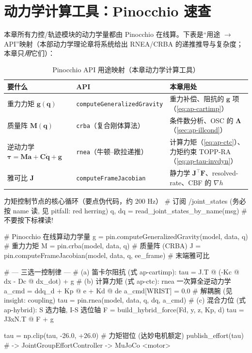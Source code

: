\section{动力学计算工具：Pinocchio 速查}
\label{sec:ap-pinocchio}

本章所有力控/轨迹模块的动力学量都由 Pinocchio 在线算。下表是“用途 $\to$ API”映射（本部动力学理论章将系统给出 RNEA/CRBA 的递推推导与复杂度；本章只\emph{用}它们）：

\begin{table}[H]\centering\small
\caption{Pinocchio API 用途映射（本章动力学计算工具）}
\begin{tabular}{p{} p{} p{}}
\toprule
要什么 & API & 本章用处 \\
\midrule
重力力矩 $\mathbf{g}(\mathbf{q})$ & \texttt{computeGeneralizedGravity} & 重力补偿、阻抗的 $\mathbf{g}$ 项（\cref{eq:ap-cartimp}）\\
质量阵 $\mathbf{M}(\mathbf{q})$ & \texttt{crba}（复合刚体算法）& 条件数分析、OSC 的 $\boldsymbol{\Lambda}$（\cref{sec:ap-illcond}）\\
逆动力学 $\boldsymbol{\tau}=\mathbf{M}\mathbf{a}+\mathbf{C}\dot{\mathbf{q}}+\mathbf{g}$ & \texttt{rnea}（牛顿--欧拉递推）& 计算力矩（\cref{eq:ap-ctc}）、力矩约束 TOPP-RA（\cref{eq:ap-tau-invdyn}）\\
雅可比 $\mathbf{J}$ & \texttt{computeFrameJacobian} & 静力学 $\mathbf{J}^\top\mathbf{F}$、resolved-rate、CBF 的 $\nabla h$ \\
\bottomrule
\end{tabular}
\label{tab:ap-pinocchio}
\end{table}

\begin{codebox}[Python]{力矩控制节点的核心循环（要点伪代码，约 200 Hz）}
# 订阅 /joint_states (务必按 name 读, 见 pitfall: red herring)
q, dq = read_joint_states_by_name(msg)        # 不要按下标裸读!

# Pinocchio 在线算动力学量
g = pin.computeGeneralizedGravity(model, data, q)        # 重力力矩
M = pin.crba(model, data, q)                             # 质量阵 (CRBA)
J = pin.computeFrameJacobian(model, data, q, ee_frame)   # 末端雅可比

# --- 三选一控制律 ---
# (a) 笛卡尔阻抗 (式 ap-cartimp):
tau = J.T @ (-Kc @ dx - Dc @ dx_dot) + g
# (b) 计算力矩 (式 ap-ctc): rnea 一次算全逆动力学
a_cmd = ddq_d + Kp @ e + Kd @ de
a_cmd[WRIST] = 0.0                            # 解耦腕 (见 insight: coupling)
tau = pin.rnea(model, data, q, dq, a_cmd)
# (c) 混合力位 (式 ap-hybrid): S 选力轴, I-S 选位轴
F = build_hybrid_force(Fd, y, z, Kp, d)
tau = J3xN.T @ F + g

tau = np.clip(tau, -26.0, +26.0)             # 力矩钳位 (达妙电机额定)
publish_effort(tau)                           # -> JointGroupEffortController -> MuJoCo <motor>
\end{codebox}

